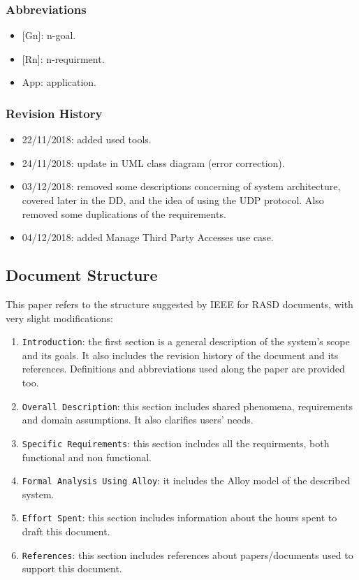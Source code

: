 \documentclass[12pt,a4paper]{article}
\begin{document}
		\subsubsection{Abbreviations}
			\begin{itemize}
				\item {[}Gn{]}: n-goal.
				\item {[Rn]}: n-requirment.
				\item {App}: application.
			\end{itemize}
		\subsubsection{Revision History}
			\begin{itemize}
				\item 22/11/2018: added used tools.
				\item 24/11/2018: update in UML class diagram (error correction).
				\item 03/12/2018: removed some descriptions concerning of system architecture, covered later in the DD, and the idea of using the UDP protocol. Also removed some duplications of the requirements.
				\item 04/12/2018: added Manage Third Party Accesses use case.
			\end{itemize}

	\subsection{Document Structure}
		This paper refers to the structure suggested by IEEE for RASD documents, with very slight modifications:
		\begin{enumerate}
			\item \texttt{Introduction}: the first section is a general description of the system's scope and its goals. It also includes the revision history of the document and its references. Definitions and abbreviations used along the paper are provided too.
			\item \texttt{Overall Description}: this section includes shared phenomena, requirements and domain assumptions. It also clarifies users' needs.
			\item \texttt{Specific Requirements}: this section includes all the requirments, both functional and non functional.
			\item \texttt{Formal Analysis Using Alloy}: it includes the Alloy model of the described system.
			\item \texttt{Effort Spent}: this section includes information about the hours spent to draft this document.
			\item \texttt{References}: this section includes references about papers/documents used to support this document.
		\end{enumerate}
\end{document}
